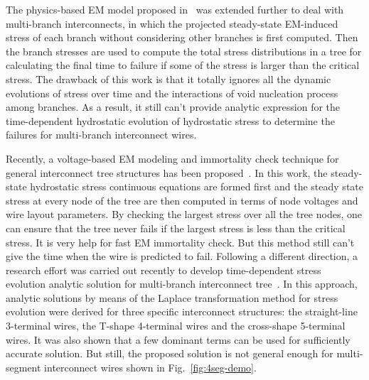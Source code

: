 The physics-based EM model proposed
in~\cite{HuangYu:DAC'14,HuangTan:TCAD'16} was extended further to deal
with multi-branch interconnects, in which the projected steady-state
EM-induced stress of each branch without considering other branches is
first computed. Then the branch stresses are used to compute the total
stress distributions in a tree for calculating the final time to
failure if some of the stress is larger than the critical stress. The
drawback of this work is that it totally ignores all the dynamic
evolutions of stress over time and the interactions of void nucleation
process among branches. As a result, it still can't provide analytic
expression for the time-dependent hydrostatic evolution of hydrostatic
stress to determine the failures for multi-branch interconnect wires.

Recently, a voltage-based EM modeling and immortality check technique
for general interconnect tree structures has been
proposed~\cite{SunDemircan:ICCAD'16}. In this work, the steady-state
hydrostatic stress continuous equations are formed first and the
steady state stress at every node of the tree are then computed in
terms of node voltages and wire layout parameters. By checking the
largest stress over all the tree nodes, one can ensure that the tree
never fails if the largest stress is less than the critical stress. It
is very help for fast EM immortality check. But this method still
can't give the time when the wire is predicted to fail. Following a
different direction, a research effort was carried out recently to
develop time-dependent stress evolution analytic solution for
multi-branch interconnect
tree~\cite{ChenHuang:DAC'15,ChenTan:TCAD'16}.  In this approach,
analytic solutions by means of the Laplace transformation method for
stress evolution were derived for three specific interconnect
structures: the straight-line 3-terminal wires, the T-shape 4-terminal
wires and the cross-shape 5-terminal wires. It was also shown that a
few dominant terms can be used for sufficiently accurate solution. But
still, the proposed solution is not general enough for multi-segment
interconnect wires shown in Fig.~\ref{fig:4seg-demo}.



